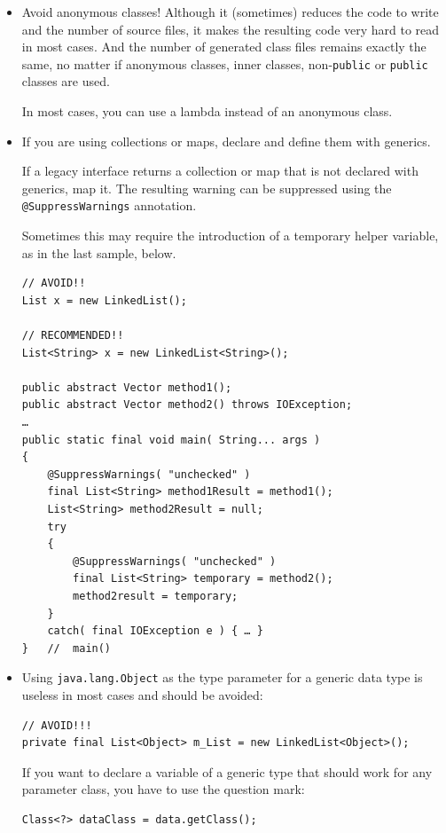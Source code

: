 \documentclass[11pt,a4paper, titlepage, parskip=half, headsepline, footsepline, cleardoublepage=current, headheight=1cm]{scrbook}
\begin{document}
\begin{itemize}
\item{Avoid anonymous classes! Although it (sometimes) reduces the code to write and the number of source files, it makes the resulting code very hard to read in most cases. And the number of generated class files remains exactly the same, no matter if anonymous classes, inner classes, non-\lstinline|public| or \lstinline|public| classes are used.

In most cases, you can use a lambda instead of an anonymous class.}

\item{If you are using collections or maps, declare and define them with generics.

If a legacy interface returns a collection or map that is not declared with generics, map it. The resulting warning can be suppressed using the \lstinline|@SuppressWarnings|\autocite{ORACLE_DOC_SUPPRESSWARNINGS_ANNOTATION} annotation.

Sometimes this may require the introduction of a temporary helper variable, as in the last sample, below.

\begin{lstlisting}
// AVOID!!
List x = new LinkedList(); 

// RECOMMENDED!!
List<String> x = new LinkedList<String>(); 

public abstract Vector method1();
public abstract Vector method2() throws IOException;
…
public static final void main( String... args )
{
    @SuppressWarnings( "unchecked" )
    final List<String> method1Result = method1();
    List<String> method2Result = null;
    try
    {
        @SuppressWarnings( "unchecked" )
        final List<String> temporary = method2();
        method2result = temporary;
    }
    catch( final IOException e ) { … }
}   //  main()
\end{lstlisting}}

\item{Using \lstinline|java.lang.Object| as the type parameter for a generic data type is useless in most cases and should be avoided:
\begin{lstlisting}
// AVOID!!!
private final List<Object> m_List = new LinkedList<Object>();
\end{lstlisting}
If you want to declare a variable of a generic type that should work for any parameter class, you have to use the question mark:
\begin{lstlisting}
Class<?> dataClass = data.getClass();
\end{lstlisting}}


\end{itemize}
\end{document}

